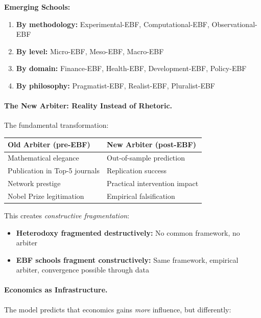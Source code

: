 \textbf{Emerging Schools:}
\begin{enumerate}[nosep]
    \item \textbf{By methodology:} Experimental-EBF, Computational-EBF, Observational-EBF
    \item \textbf{By level:} Micro-EBF, Meso-EBF, Macro-EBF
    \item \textbf{By domain:} Finance-EBF, Health-EBF, Development-EBF, Policy-EBF
    \item \textbf{By philosophy:} Pragmatist-EBF, Realist-EBF, Pluralist-EBF
\end{enumerate}

\paragraph{The New Arbiter: Reality Instead of Rhetoric.}

The fundamental transformation:

\begin{center}
\renewcommand{\arraystretch}{1.3}
\small
\begin{tabular}{@{}ll@{}}
\toprule
\textbf{Old Arbiter (pre-EBF)} & \textbf{New Arbiter (post-EBF)} \\
\midrule
Mathematical elegance & Out-of-sample prediction \\
Publication in Top-5 journals & Replication success \\
Network prestige & Practical intervention impact \\
Nobel Prize legitimation & Empirical falsification \\
\bottomrule
\end{tabular}
\end{center}

This creates \textit{constructive fragmentation}:
\begin{itemize}[nosep]
    \item \textbf{Heterodoxy fragmented destructively:} No common framework, no arbiter
    \item \textbf{EBF schools fragment constructively:} Same framework, empirical arbiter,
        convergence possible through data
\end{itemize}

\paragraph{Economics as Infrastructure.}

The model predicts that economics gains \textit{more} influence, but differently:

